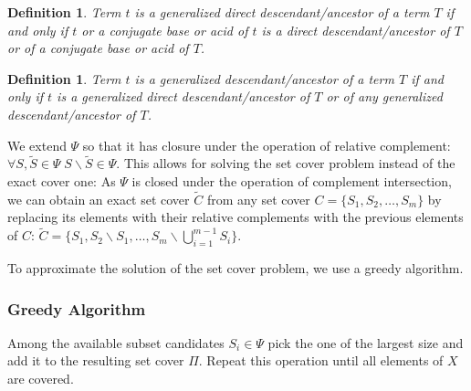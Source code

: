 \documentclass[9pt]{article}
\newcounter{def}
\newcounter{rm}
\begin{document}
\newtheorem{dirgent}[def]{Definition}
\begin{dirgent}
Term $t$ is a \emph{generalized direct descendant/ancestor} of a term $T$ if and only if $t$ or a conjugate base or acid of $t$ is a direct descendant/ancestor of $T$ or of a conjugate base or acid of $T$.
\end{dirgent} 

\newtheorem{gent}[def]{Definition}
\begin{gent}
Term $t$ is a \emph{generalized descendant/ancestor} of a term $T$ if and only if $t$ is a generalized direct descendant/ancestor of $T$ or of any generalized descendant/ancestor of $T$.
\end{gent} 

We extend $\Psi$ so that it has closure under the operation of relative complement: $\forall S,\tilde{S} \in \Psi \; S\backslash\tilde{S} \in \Psi$. This allows for solving the set cover problem instead of the exact cover one:  As $\Psi$ is closed under the operation of complement intersection, we can obtain an exact set cover $\tilde{C}$ from any set cover $C = \{S_1, S_2, \ldots, S_m\}$ by replacing its elements with their relative complements with the previous elements of $C$: $\tilde{C} = \{S_1, S_2 \backslash S_1, \ldots, S_m \backslash \bigcup^{m - 1}_{i = 1}{S_i}\}$.

To approximate the solution of the set cover problem, we use a greedy algorithm.

\subsubsection*{Greedy Algorithm}
Among the available subset candidates $S_i \in \Psi$ pick the one of the largest size and add it to the resulting set cover $\Pi$. Repeat this operation until all elements of $X$ are covered. \\
\end{document}

